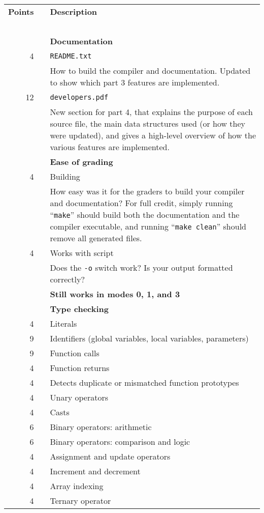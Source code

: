 \documentclass{article}
\makeatletter
\newcommand{\gradeline}{ \cline{1-2} \cline{4-4} ~\\[-1.5ex] }
\newenvironment{gradetable}{\begin{longtable}{@{}rrcp{5in}} \multicolumn{2}{l}{\bf Points} & & {\bf Description}\\ \gradeline}{\end{longtable}}
\newcommand{\mainitem}[2]{\pagebreak[2] {\bf #1} &&& {\bf #2}}
\newcommand{\inneritem}[2]{~ & #1 && #2}
\newcommand{\innerpara}[1]{~ & ~ && #1}
\newcommand{\parser}{3}
\newcommand{\typecheck}{4}
\makeatother
\begin{document}
\noindent
\begin{gradetable}
  \mainitem{16}{Documentation}
  \\[1mm]
  \inneritem{4}{\tt README.txt}
  \\[1mm]
  \innerpara{%
    How to build the compiler and documentation.
    Updated to show which part 3 features are implemented.
  }
  \\[1mm]
  \inneritem{12}{\tt developers.pdf}
  \\[1mm]
  \innerpara{%
    New section for part \typecheck, that explains
    the purpose of each source file,
    the main data structures used (or how they were updated),
    and gives a high-level overview of how the various
    features are implemented.
  }
  \\[4mm]

  \mainitem{8}{Ease of grading}
  \\[1mm]
  \inneritem{4}{Building}
  \\[1mm]
  \innerpara{%
    How easy was it for the graders to build your compiler and
    documentation?
    For full credit, simply running ``{\tt make}''
    should build both the documentation and the compiler executable,
    and running ``{\tt make clean}'' should remove
    all generated files.
  }
  \\[1mm]
  \inneritem{4}{Works with script}
  \\[1mm]
  \innerpara{%
    Does the {\tt -o} switch work?
    Is your output formatted correctly?
  }
  \\[4mm]

  \mainitem{10}{Still works in modes 0, 1, and \parser}
  \\[4mm]

  \mainitem{66}{Type checking}
  \\[1mm]
  \inneritem{4}{Literals}
  \\[1mm]
  \inneritem{9}{Identifiers (global variables, local variables, parameters)}
  \\[1mm]
  \inneritem{9}{Function calls}
  \\[1mm]
  \inneritem{4}{Function returns}
  \\[1mm]
  \inneritem{4}{Detects duplicate or mismatched function prototypes}
  \\[1mm]
  \inneritem{4}{Unary operators}
  \\[1mm]
  \inneritem{4}{Casts}
  \\[1mm]
  \inneritem{6}{Binary operators: arithmetic}
  \\[1mm]
  \inneritem{6}{Binary operators: comparison and logic}
  \\[1mm]
  \inneritem{4}{Assignment and update operators}
  \\[1mm]
  \inneritem{4}{Increment and decrement}
  \\[1mm]
  \inneritem{4}{Array indexing}
  \\[1mm]
  \inneritem{4}{Ternary operator}
  \\[1mm]


\end{gradetable}
\end{document}
